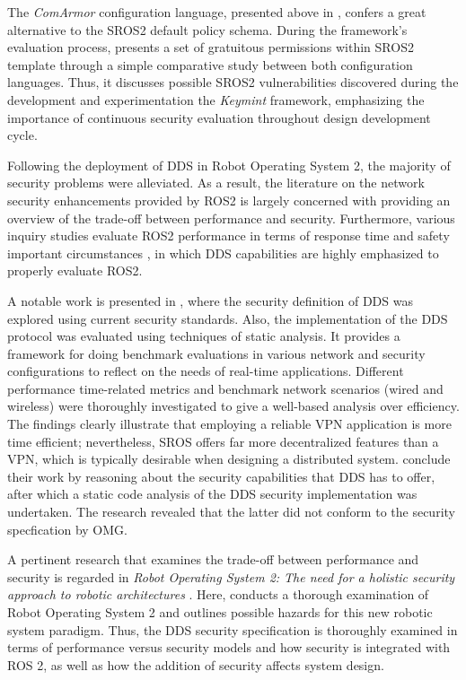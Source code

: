 The \textit{ComArmor} configuration language, presented above in , confers a great alternative to the SROS2 default policy schema. During the framework's evaluation process, \citeauthor{white2018procedurally} presents a set of gratuitous permissions within SROS2 template through a simple comparative study between both configuration languages. Thus, it discusses possible SROS2 vulnerabilities discovered during the development and experimentation the \textit{Keymint} framework, emphasizing the importance of continuous security evaluation throughout design development cycle.

Following the deployment of DDS in Robot Operating System 2, the majority of security problems were alleviated. As a result, the literature on the network security enhancements provided by ROS2 is largely concerned with providing an overview of the trade-off between performance and security. Furthermore, various inquiry studies evaluate ROS2 performance in terms of response time and safety important circumstances \cite{maruyama2016exploring, casini2019response}, in which DDS capabilities are highly emphasized to properly evaluate ROS2.

A notable work is presented in , where the security definition of DDS was explored using current security standards. Also, the implementation of the DDS protocol was evaluated using techniques of static analysis. It provides a framework for doing benchmark evaluations in various network and security configurations to reflect on the needs of real-time applications. Different performance time-related metrics and benchmark network scenarios (wired and wireless) were thoroughly investigated to give a well-based analysis over efficiency. The findings clearly illustrate that employing a reliable VPN application is more time efficient; nevertheless, SROS offers far more decentralized features than a VPN, which is typically desirable when designing a distributed system. \citeauthor*{kim2018security} conclude their work by reasoning about the security capabilities that DDS has to offer, after which a static code analysis of the DDS security implementation was undertaken. The research revealed that the latter did not conform to the security specfication by OMG. 

A pertinent research that examines the trade-off between performance and security is regarded in \textit{Robot Operating System 2: The need for a holistic security approach to robotic architectures} \cite{diluoffo2018robot}. Here, \citeauthor{diluoffo2018robot} conducts a thorough examination of Robot Operating System 2 and outlines possible hazards for this new robotic system paradigm. Thus, the DDS security specification is thoroughly examined in terms of performance versus security models and how security is integrated with ROS 2, as well as how the addition of security affects system design. 

